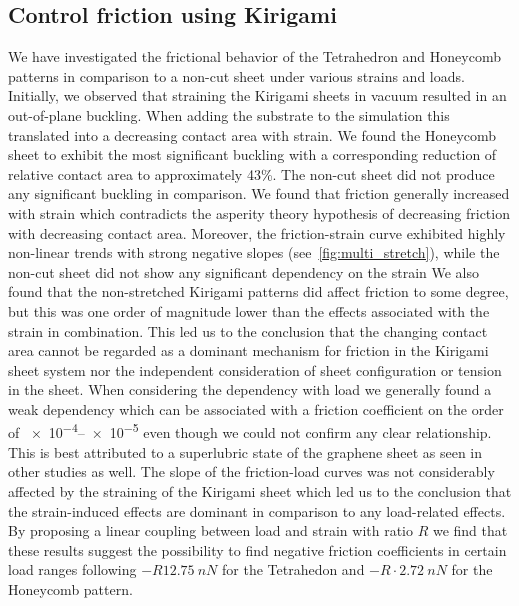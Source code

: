 \subsection{Control friction using Kirigami}
We have investigated the frictional behavior of the Tetrahedron and Honeycomb
patterns in comparison to a non-cut sheet under various strains and loads.
Initially, we observed that straining the Kirigami sheets in vacuum resulted in an out-of-plane buckling. When adding the substrate to the simulation
this translated into a decreasing contact area with strain. We found the
Honeycomb sheet to exhibit the most significant buckling with a corresponding
reduction of relative contact area to approximately 43\%. The non-cut sheet did
not produce any significant buckling in comparison. We found that friction generally increased with strain which contradicts the asperity theory hypothesis of decreasing friction with
decreasing contact area. Moreover, the friction-strain curve exhibited highly
non-linear trends with strong negative slopes (see~\cref{fig:multi_stretch}), while the non-cut sheet did not show any significant dependency on the strain We also found that the non-stretched Kirigami patterns did affect friction to some degree, but this was one order of magnitude lower than the effects associated with the strain in combination. This led us to the conclusion that the changing contact area cannot be regarded as a dominant mechanism for friction in the Kirigami sheet system nor the independent consideration of sheet configuration or tension in the sheet. When considering the dependency with load we generally found a weak dependency which can be associated with a friction coefficient on the order of
\num{e-4}--\num{e-5} even though we could not confirm any clear relationship.
This is best attributed to a superlubric state of the graphene sheet as seen in other studies as well. The slope of the friction-load curves was not considerably affected by the straining of the Kirigami sheet which led us to the conclusion that the strain-induced effects are dominant in comparison to any load-related effects. By proposing a linear coupling between load and strain with ratio $R$ we find that these results suggest the possibility to find negative friction coefficients in certain load ranges following $-R\SI{12.75}{nN}$ for the Tetrahedon and $-R\cdot\SI{2.72}{nN}$ for the Honeycomb pattern.




